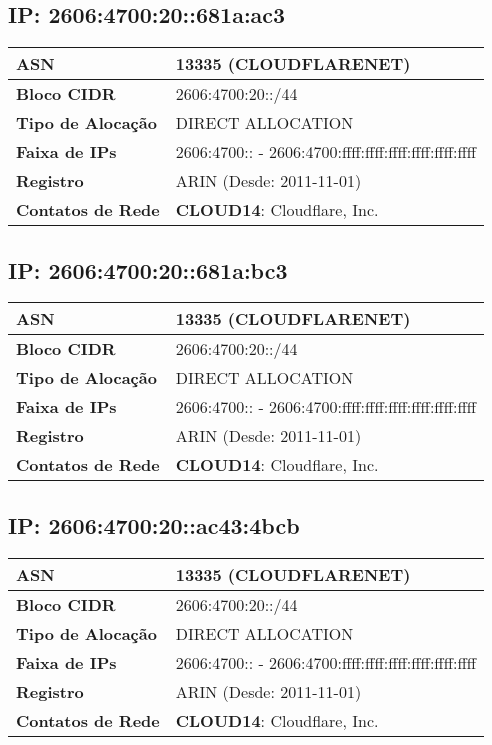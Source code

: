     \subsection{IP: 2606:4700:20::681a:ac3}
    \begin{tabular}{|l|l|}
    \hline
    \textbf{ASN} & 13335 (CLOUDFLARENET) \\ \hline
    \textbf{Bloco CIDR} & 2606:4700:20::/44 \\ \hline
    \textbf{Tipo de Alocação} & DIRECT ALLOCATION \\ \hline
    \textbf{Faixa de IPs} & 2606:4700:: - 2606:4700:ffff:ffff:ffff:ffff:ffff:ffff \\ \hline
    \textbf{Registro} & ARIN (Desde: 2011-11-01) \\ \hline
        
\textbf{Contatos de Rede} & \textbf{CLOUD14}: Cloudflare, Inc. 
\\ \hline
\end{tabular}


    \subsection{IP: 2606:4700:20::681a:bc3}
    \begin{tabular}{|l|l|}
    \hline
    \textbf{ASN} & 13335 (CLOUDFLARENET) \\ \hline
    \textbf{Bloco CIDR} & 2606:4700:20::/44 \\ \hline
    \textbf{Tipo de Alocação} & DIRECT ALLOCATION \\ \hline
    \textbf{Faixa de IPs} & 2606:4700:: - 2606:4700:ffff:ffff:ffff:ffff:ffff:ffff \\ \hline
    \textbf{Registro} & ARIN (Desde: 2011-11-01) \\ \hline
        
\textbf{Contatos de Rede} & \textbf{CLOUD14}: Cloudflare, Inc. 
\\ \hline
\end{tabular}


    \subsection{IP: 2606:4700:20::ac43:4bcb}
    \begin{tabular}{|l|l|}
    \hline
    \textbf{ASN} & 13335 (CLOUDFLARENET) \\ \hline
    \textbf{Bloco CIDR} & 2606:4700:20::/44 \\ \hline
    \textbf{Tipo de Alocação} & DIRECT ALLOCATION \\ \hline
    \textbf{Faixa de IPs} & 2606:4700:: - 2606:4700:ffff:ffff:ffff:ffff:ffff:ffff \\ \hline
    \textbf{Registro} & ARIN (Desde: 2011-11-01) \\ \hline
        
\textbf{Contatos de Rede} & \textbf{CLOUD14}: Cloudflare, Inc. 
\\ \hline
\end{tabular}
